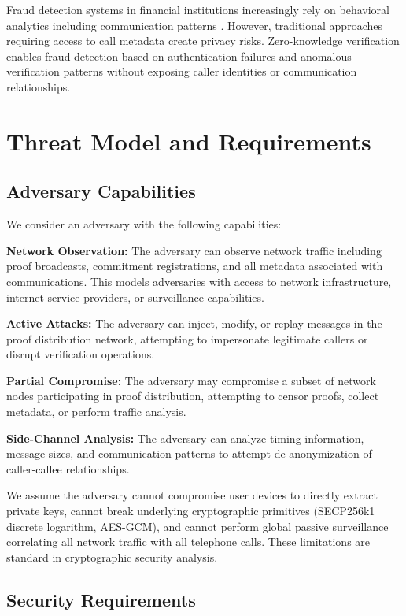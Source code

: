 \documentclass[11pt,twocolumn]{article}
\begin{document}
Fraud detection systems in financial institutions increasingly rely on behavioral analytics including communication patterns \cite{ngai2011}. However, traditional approaches requiring access to call metadata create privacy risks. Zero-knowledge verification enables fraud detection based on authentication failures and anomalous verification patterns without exposing caller identities or communication relationships.

\section{Threat Model and Requirements}

\subsection{Adversary Capabilities}

We consider an adversary with the following capabilities:

\textbf{Network Observation:} The adversary can observe network traffic including proof broadcasts, commitment registrations, and all metadata associated with communications. This models adversaries with access to network infrastructure, internet service providers, or surveillance capabilities.

\textbf{Active Attacks:} The adversary can inject, modify, or replay messages in the proof distribution network, attempting to impersonate legitimate callers or disrupt verification operations.

\textbf{Partial Compromise:} The adversary may compromise a subset of network nodes participating in proof distribution, attempting to censor proofs, collect metadata, or perform traffic analysis.

\textbf{Side-Channel Analysis:} The adversary can analyze timing information, message sizes, and communication patterns to attempt de-anonymization of caller-callee relationships.

We assume the adversary cannot compromise user devices to directly extract private keys, cannot break underlying cryptographic primitives (SECP256k1 discrete logarithm, AES-GCM), and cannot perform global passive surveillance correlating all network traffic with all telephone calls. These limitations are standard in cryptographic security analysis.

\subsection{Security Requirements}
\end{document}
